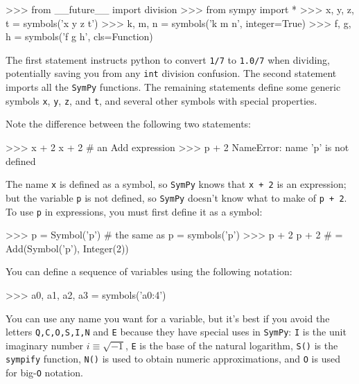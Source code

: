\small
\begin{verbatimtab}
>>> from __future__ import division
>>> from sympy import *
>>> x, y, z, t = symbols('x y z t')
>>> k, m, n = symbols('k m n', integer=True)
>>> f, g, h = symbols('f g h', cls=Function)
\end{verbatimtab}
\normalsize

\noindent
The first statement instructs python to convert \texttt{1/7} to \texttt{1.0/7} when dividing,
potentially saving you from any \texttt{int} division confusion.
The second statement imports all the \texttt{SymPy} functions.
The remaining statements define some generic symbols \texttt{x}, \texttt{y}, \texttt{z}, and \texttt{t},
and several other symbols with special properties.

Note the difference between the following two statements:

\small
\begin{verbatimtab}
>>> x + 2           
x + 2                 # an Add expression
>>> p + 2 
NameError: name 'p' is not defined
\end{verbatimtab}
\normalsize

\noindent
The name \texttt{x} is defined as a symbol, so \texttt{SymPy} knows that \texttt{x + 2} is an expression;
but the variable \texttt{p} is not defined, so \texttt{SymPy} doesn't know what to make of \texttt{p + 2}.
To use \texttt{p} in expressions, 
you must first define it as a symbol:

\small
\begin{verbatimtab}
>>> p = Symbol('p')   # the same as p = symbols('p')
>>> p + 2
p + 2                 # = Add(Symbol('p'), Integer(2))
\end{verbatimtab}
\normalsize


\printcp

\noindent
You can define a sequence of variables using the following notation:
\small
\begin{verbatimtab}
>>> a0, a1, a2, a3 = symbols('a0:4')
\end{verbatimtab}
\normalsize

\noindent
You can use any name you want for a variable,
but it's best if you avoid the letters \texttt{Q,C,O,S,I,N} and \texttt{E} because they have special uses in \texttt{SymPy}:
\texttt{I} is the unit imaginary number $i\equiv\sqrt{-1}$, 
\texttt{E} is the base of the natural logarithm,
\texttt{S()} is the \texttt{sympify} function,
\texttt{N()} is used to obtain numeric approximations, and
\texttt{O} is used for big-\texttt{O} notation.

